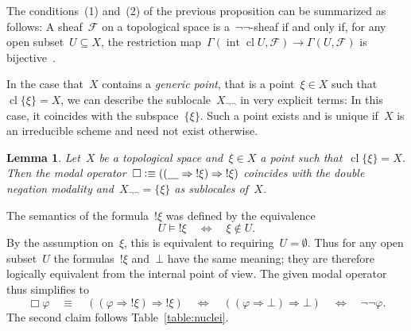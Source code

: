 \documentclass[10pt,reqno,a4paper]{amsbook}
\makeatletter
\theoremstyle{definition}
\theoremstyle{plain}
\newtheorem{lemma}[defn]{Lemma}
\theoremstyle{remark}
\newcommand{\F}{\mathcal{F}}
\newcommand{\placeholder}{\underline{\quad}}
\DeclareMathOperator{\Int}{int}
\DeclareMathOperator{\Clos}{cl}
\newcommand{\?}{\,{:}\,}
\renewcommand{\_}{\mathpunct{.}\,}
\newcommand{\notat}[1]{{!#1}}
\newcommand{\defequiv}{\vcentcolon\equiv}
\renewenvironment{proof}[1][\proofname]{\par
  \pushQED{\qed}%
  \normalfont \topsep6\p@\@plus6\p@\relax
  \trivlist
  \item[\hskip\labelsep
        \itshape
    #1\@addpunct{.}]\ignorespaces
}{%
  \popQED\endtrivlist\@endpefalse
}
\makeatother
\begin{document}
The conditions~(1) and~(2) of the previous proposition can be
summarized as follows: A sheaf~$\F$ on a topological space is
a~$\neg\neg$-sheaf if and only if, for any open subset~$U \subseteq X$, the
restriction map~$\Gamma(\Int\Clos U, \F) \to \Gamma(U,\F)$ is
bijective~\cite[Lemma~36]{jackson:sheaf-theoretic-measure-theory}.

In the case that~$X$ contains a \emph{generic point}, that is a point~$\xi \in X$
such that~$\Clos\{\xi\} = X$, we can describe the sublocale~$X_{\neg\neg}$ in
very explicit terms: In this case, it coincides with the subspace~$\{\xi\}$.
Such a point exists and is unique if~$X$ is an irreducible scheme and need not
exist otherwise.

\begin{lemma}\label{lemma:negneg-generic-point}
Let~$X$ be a topological space and~$\xi \in X$ a point such
that~$\Clos\{\xi\} = X$. Then the modal operator~$\Box \defequiv ((\placeholder
\Rightarrow \notat{\xi}) \Rightarrow \notat{\xi})$ coincides with the double
negation modality and~$X_{\neg\neg} = \{\xi\}$ as sublocales of~$X$.\end{lemma}
\begin{proof}The semantics of the formula~$\notat{\xi}$ was defined by the
equivalence
\[ U \models \notat{\xi} \quad\Longleftrightarrow\quad
  \xi \not\in U. \]
By the assumption on~$\xi$, this is equivalent to requiring~$U = \emptyset$.
Thus for any open subset~$U$ the formulas~$\notat{\xi}$ and~$\bot$ have the
same meaning; they are therefore logically equivalent from the internal point of
view. The given modal operator thus simplifies to
\[ \Box\varphi \quad\equiv\quad ((\varphi \Rightarrow \notat{\xi}) \Rightarrow \notat{\xi})
  \quad\Leftrightarrow\quad ((\varphi \Rightarrow \bot) \Rightarrow \bot)
  \quad\Leftrightarrow\quad \neg\neg\varphi. \]
The second claim follows Table~\ref{table:nuclei}.
\end{proof}
\end{document}
